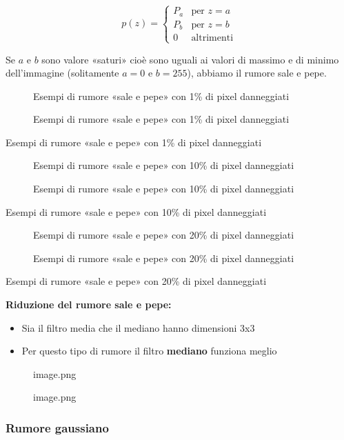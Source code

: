 \documentclass[
]{article}
\providecommand{\tightlist}{%
  \setlength{\itemsep}{0pt}\setlength{\parskip}{0pt}}
\begin{document}
\[
p(z) = \begin{cases} P_a & \text{per } z = a \\P_b & \text{per } z = b \\0 & \text{altrimenti}\end{cases}
\]

Se \(a\) e \(b\) sono valore «saturi» cioè sono uguali ai valori di massimo e di minimo dell'immagine (solitamente \(a=0\) e \(b=255\)), abbiamo il rumore sale e pepe.

\begin{figure}
\centering
{Esempi di rumore «sale e pepe» con 1\% di pixel danneggiati}
\caption{Esempi di rumore «sale e pepe» con 1\% di pixel danneggiati}
\end{figure}

Esempi di rumore «sale e pepe» con 1\% di pixel danneggiati

\begin{figure}
\centering
{Esempi di rumore «sale e pepe» con 10\% di pixel danneggiati}
\caption{Esempi di rumore «sale e pepe» con 10\% di pixel danneggiati}
\end{figure}

Esempi di rumore «sale e pepe» con 10\% di pixel danneggiati

\begin{figure}
\centering
{Esempi di rumore «sale e pepe» con 20\% di pixel danneggiati}
\caption{Esempi di rumore «sale e pepe» con 20\% di pixel danneggiati}
\end{figure}

Esempi di rumore «sale e pepe» con 20\% di pixel danneggiati

\textbf{Riduzione del rumore sale e pepe:}

\begin{itemize}
\tightlist
\item
  Sia il filtro media che il mediano hanno dimensioni 3x3
\item
  Per questo tipo di rumore il filtro \textbf{mediano} funziona meglio
\end{itemize}

\begin{figure}
\centering
{image.png}
\caption{image.png}
\end{figure}

\hypertarget{rumore-gaussiano}{%
\subsubsection{Rumore gaussiano}\label{rumore-gaussiano}}
\end{document}
